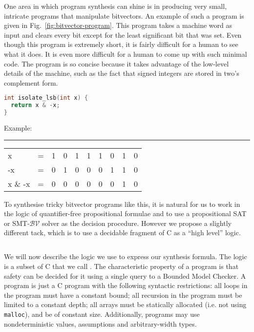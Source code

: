 One area in which program synthesis can shine is in producing very small,
intricate programs that manipulate bitvectors.  An example of such a program
is given in Fig.~\ref{fig:bitvector-program}.  This program takes a machine word
as input and clears every bit except for the least significant bit that was set.
Even though this program is extremely short, it is fairly difficult for a human
to see what it does.  It is even more difficult for a human to come up with such
minimal code.  The program is so concise because it
takes advantage of the low-level details of the machine, such as the fact that
signed integers are stored in two's complement form.

\begin{figure*}
\centering
\begin{minipage}{0.45\linewidth}
 \begin{lstlisting}[language=C]
int isolate_lsb(int x) {
  return x & -x;
}
 \end{lstlisting}
\end{minipage}
\begin{minipage}{0.45\linewidth}
 
Example:

\hrule

\begin{tabular}{llcccccccc}
 x       & = & 1 & 0 & 1 & 1 & 1 & 0 & 1 & 0 \\
 -x      & = & 0 & 1 & 0 & 0 & 0 & 1 & 1 & 0 \\
 x \& -x & = & 0 & 0 & 0 & 0 & 0 & 0 & 1 & 0
\end{tabular}
\end{minipage}


 \caption{A tricky bitvector program}
  \label{fig:bitvector-program}
\end{figure*}


To synthesise tricky bitvector programs like this, it is natural for us to
work in the logic of quantifier-free propositional formulae and to use a
propositional SAT or SMT-$\mathcal{BV}$ solver as the decision procedure. 
However we propose a slightly different tack, which is to use a decidable
fragment of C as a ``high level'' logic.
\fi

\subsection{\newC}
\label{sec:logic}

We will now describe the logic we use to express our synthesis formula.
The logic is a subset of C that we call \newC.  The characteristic property of a
\newC  program is that safety can be decided for
it using a single query to a Bounded Model Checker.  A \newC program is
just a C program with the following syntactic restrictions:
 all loops in the program must have a constant bound;
 all recursion in the program must be limited to a constant depth;
 all arrays must be statically allocated (i.e. not using \texttt{malloc}),
 and be of constant size.
Additionally, \newC programs may use nondeterministic values, assumptions
and arbitrary-width types.

